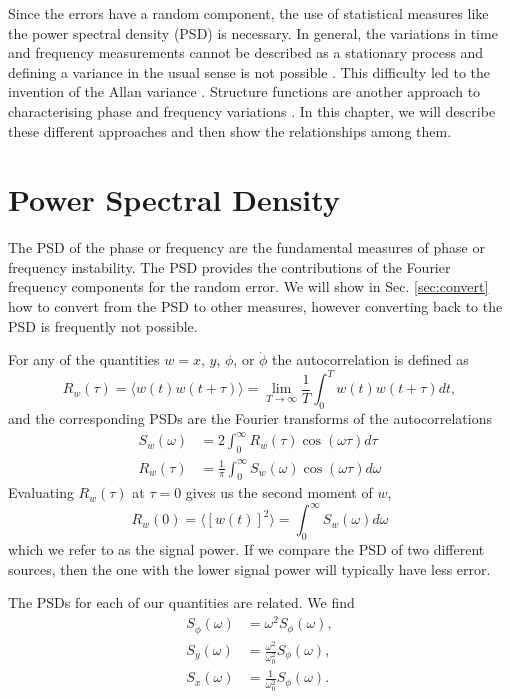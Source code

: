 Since the errors have a random component, the use of statistical measures like the power spectral density (PSD) is necessary. In general, the variations in time and frequency measurements cannot be described as a stationary process and defining a variance in the usual sense is not possible \cite{Allan1974, blair1974time}. This difficulty led to the invention of the Allan variance \cite{Allan1974, blair1974time}. Structure functions are another approach to characterising phase and frequency variations \cite{Lindsey1976}. In this chapter, we will describe these different approaches and then show the relationships among them.

\section{Power Spectral Density} \label{sec:psd}

The PSD of the phase or frequency are the fundamental measures of phase or frequency instability. The PSD provides the contributions of the Fourier frequency components for the random error. We will show in Sec. \ref{sec:convert} how to convert from the PSD to other measures, however converting back to the PSD is frequently not possible.

For any of the quantities $w=x$, $y$, $\phi$, or $\dot{\phi}$ the autocorrelation is defined as
%
\begin{equation}
\label{eq:autocorr}
R_w(\tau) = \langle w(t)w(t+\tau) \rangle = \lim\limits_{T\to\infty}\frac{1}{T}\int_{0}^{T} w(t)w(t+\tau)dt,
\end{equation}
%
and the corresponding PSDs are the Fourier transforms of the autocorrelations
%
\begin{align}
S_w(\omega) &= 2\int_0^\infty R_w(\tau)\cos(\omega\tau)d\tau \\
R_w(\tau) &= \frac{1}{\pi}\int_0^\infty S_w(\omega)\cos(\omega\tau)d\omega
\end{align}
%
Evaluating $R_w(\tau)$ at $\tau = 0$ gives us the second moment of $w$, 
%
\begin{equation*}
R_w(0) = \langle [w(t)]^2 \rangle = \int_0^\infty S_w(\omega) d\omega
\end{equation*}
%
which we refer to as the signal power. If we compare the PSD of two different sources, then the one with the lower signal power will typically have less error.

The PSDs for each of our quantities are related. We find
%
\begin{subequations}
\begin{align}
S_{\dot{\phi}}(\omega) &= \omega^2 S_\phi(\omega), \\
S_y(\omega) &= \frac{\omega^2}{\omega_0^2}S_\phi(\omega), \\
S_x(\omega) &= \frac{1}{\omega_0^2}S_\phi(\omega).
\end{align}
\end{subequations}


